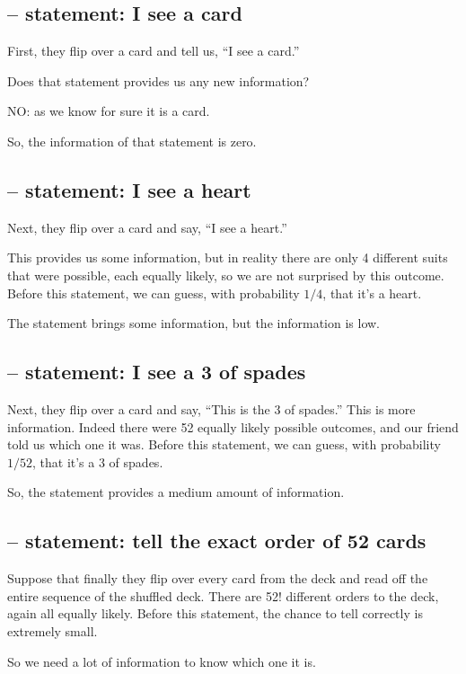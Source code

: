 \subsection{-- statement: I see a card}


First, they flip over a card and tell us, “I see a card.” 

Does that statement provides us any new information? 

NO: as we know for sure it is a card. 

So, the information of that statement is zero. 


\subsection{-- statement: I see a heart}

Next, they flip over a card and say, “I see a heart.” 

This provides us some information, but in reality there are only 4 different
suits that were possible, each equally likely, so we are not surprised by this
outcome. Before this statement, we can guess, with probability $1/4$, that it's a heart.

The statement brings some information, but the information is low. 

\subsection{-- statement: I see a 3 of spades}


Next, they flip over a card and say, “This is the 3 of spades.” This is more
information. Indeed there were 52 equally likely possible outcomes, and our
friend told us which one it was. Before this statement, we can guess, with
probability $1/52$, that it's a 3 of spades.

So, the statement provides a medium amount of information.

\subsection{-- statement: tell the exact order of 52 cards}


Suppose that finally they flip over every card from the deck and read off the
entire sequence of the shuffled deck. There are 52! different orders to the
deck, again all equally likely. Before this statement, the chance to tell correctly is extremely small.


So we need a lot of information to know which one it is.

